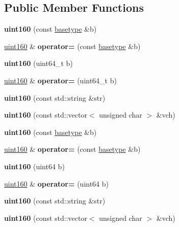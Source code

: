\subsection*{Public Member Functions}
\begin{DoxyCompactItemize}
\item 
\mbox{\label{classuint160_a75845399393bb5552c2777ec2b7e8b28}} 
{\bfseries uint160} (const \mbox{\hyperlink{classbase__uint}{basetype}} \&b)
\item 
\mbox{\label{classuint160_a5bb8662b198c36214e3d336a43f22457}} 
\mbox{\hyperlink{classuint160}{uint160}} \& {\bfseries operator=} (const \mbox{\hyperlink{classbase__uint}{basetype}} \&b)
\item 
\mbox{\label{classuint160_a1b4399cc586066b0c61401921be5d041}} 
{\bfseries uint160} (uint64\+\_\+t b)
\item 
\mbox{\label{classuint160_a954fa63ae8770af4698be995d3d0366d}} 
\mbox{\hyperlink{classuint160}{uint160}} \& {\bfseries operator=} (uint64\+\_\+t b)
\item 
\mbox{\label{classuint160_a17be565c999f678e47d12e694446e0c4}} 
{\bfseries uint160} (const std\+::string \&str)
\item 
\mbox{\label{classuint160_a92bd85c77e73d6642f9bb7519cbd480c}} 
{\bfseries uint160} (const std\+::vector$<$ unsigned char $>$ \&vch)
\item 
\mbox{\label{classuint160_a75845399393bb5552c2777ec2b7e8b28}} 
{\bfseries uint160} (const \mbox{\hyperlink{classbase__uint}{basetype}} \&b)
\item 
\mbox{\label{classuint160_a5bb8662b198c36214e3d336a43f22457}} 
\mbox{\hyperlink{classuint160}{uint160}} \& {\bfseries operator=} (const \mbox{\hyperlink{classbase__uint}{basetype}} \&b)
\item 
\mbox{\label{classuint160_a7d07d8e04cd9516797cebe48e80ecb87}} 
{\bfseries uint160} (uint64 b)
\item 
\mbox{\label{classuint160_a12d21510c0e1f898f454fdb2ee270907}} 
\mbox{\hyperlink{classuint160}{uint160}} \& {\bfseries operator=} (uint64 b)
\item 
\mbox{\label{classuint160_a17be565c999f678e47d12e694446e0c4}} 
{\bfseries uint160} (const std\+::string \&str)
\item 
\mbox{\label{classuint160_a92bd85c77e73d6642f9bb7519cbd480c}} 
{\bfseries uint160} (const std\+::vector$<$ unsigned char $>$ \&vch)
\end{DoxyCompactItemize}
